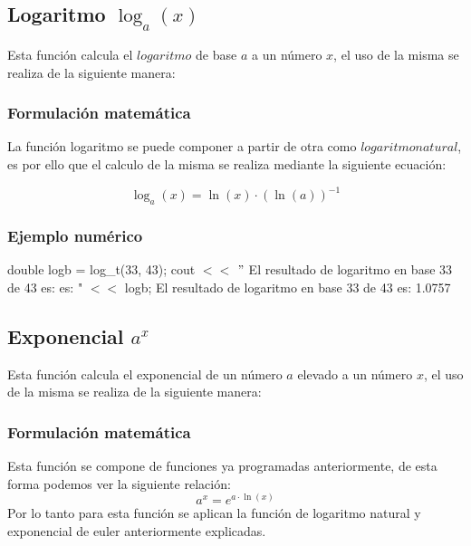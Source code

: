 \documentclass[10pt,a4paper]{article}
\begin{document}
	\subsection{Logaritmo $\log_{a}(x)$}
	
	Esta función calcula el $logaritmo$ de base $a$ a un número $x$, el uso de la misma se realiza de la siguiente manera:
	
	\begin{center}
	\end{center}
	
	\subsubsection{Formulación matemática}
	
	La función logaritmo se puede componer a partir de otra como $logaritmo natural$, es por ello que el calculo de la misma se realiza mediante la siguiente ecuación:
	
	\begin{equation}\label{key13}
		\log_{a}(x) = \ln(x)\cdot (\ln(a))^{-1}
	\end{equation}
	
	\subsubsection{Ejemplo numérico}

	double logb = log{\_}t(33, 43); \newline
	cout $<<$ $"$ El resultado de logaritmo en base 33 de 43 es: es: " $<<$ logb;
	El resultado de  logaritmo en base 33 de 43 es: 1.0757\newline
	
	\subsection{Exponencial $a^{x}$}
	
	Esta función calcula el exponencial de un número $a$ elevado a un número $x$, el uso de la misma se realiza de la siguiente manera:
	
	\begin{center}
	\end{center}
	
	\subsubsection{Formulación matemática}
	Esta función se compone de funciones ya programadas anteriormente, de esta forma podemos ver la siguiente relación:
	\begin{equation}\label{key13}
		a^{x} = e^{a \cdot \ln(x)}
	\end{equation}
	Por lo tanto para esta función se aplican la función de logaritmo natural y exponencial de euler anteriormente explicadas.
	
\end{document}
